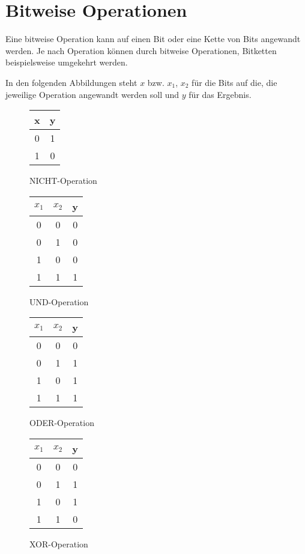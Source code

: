\chapter{Bitweise Operationen}
Eine bitweise Operation kann auf einen Bit oder eine Kette von Bits angewandt werden.
Je nach Operation können durch bitweise Operationen, Bitketten beispielsweise umgekehrt werden.

In den folgenden Abbildungen steht $x$ bzw. $x_1$, $x_2$ für die Bits auf die, die jeweilige Operation angewandt werden soll und $y$ für das Ergebnis.

\begin{figure}[ht]
    \centering
    \begin{tabular}{|c|c|}
        \hline
        x & y \\
        \hline
        0 & 1 \\
        \hline
        1 & 0 \\
        \hline
    \end{tabular}
    \caption{NICHT-Operation}
\end{figure}

\begin{figure}[ht]
    \centering
    \begin{tabular}{|c|c|c|}
        \hline
        $x_1$ & $x_2$ & y \\
        \hline
        0 & 0 & 0 \\
        \hline
        0 & 1 & 0 \\
        \hline
        1 & 0 & 0 \\
        \hline
        1 & 1 & 1 \\
        \hline
    \end{tabular}
    \caption{UND-Operation}
\end{figure}

\begin{figure}[ht]
    \centering
    \begin{tabular}{|c|c|c|}
        \hline
        $x_1$ & $x_2$ & y \\
        \hline
        0 & 0 & 0 \\
        \hline
        0 & 1 & 1 \\
        \hline
        1 & 0 & 1 \\
        \hline
        1 & 1 & 1 \\
        \hline
    \end{tabular}
    \caption{ODER-Operation}
    \label{fig:or}
\end{figure}

\begin{figure}[ht]
    \centering
    \begin{tabular}{|c|c|c|}
        \hline
        $x_1$ & $x_2$ & y \\
        \hline
        0 & 0 & 0 \\
        \hline
        0 & 1 & 1 \\
        \hline
        1 & 0 & 1 \\
        \hline
        1 & 1 & 0 \\
        \hline
    \end{tabular}
    \caption{XOR-Operation}
\end{figure}

